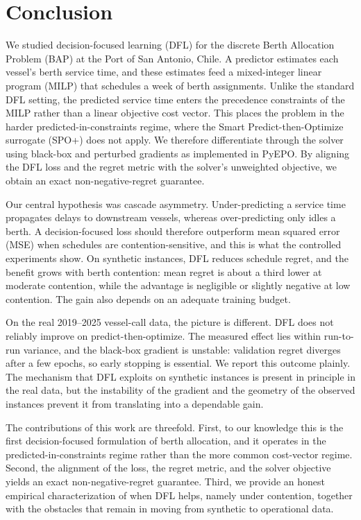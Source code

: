 \section{Conclusion}\label{sec:conclusion}

We studied decision-focused learning (DFL) for the discrete Berth Allocation Problem (BAP) at the Port of San Antonio, Chile. A predictor estimates each vessel's berth service time, and these estimates feed a mixed-integer linear program (MILP) that schedules a week of berth assignments. Unlike the standard DFL setting, the predicted service time enters the precedence constraints of the MILP rather than a linear objective cost vector. This places the problem in the harder predicted-in-constraints regime, where the Smart Predict-then-Optimize surrogate (SPO+) does not apply. We therefore differentiate through the solver using black-box and perturbed gradients as implemented in PyEPO. By aligning the DFL loss and the regret metric with the solver's unweighted objective, we obtain an exact non-negative-regret guarantee.

Our central hypothesis was cascade asymmetry. Under-predicting a service time propagates delays to downstream vessels, whereas over-predicting only idles a berth. A decision-focused loss should therefore outperform mean squared error (MSE) when schedules are contention-sensitive, and this is what the controlled experiments show. On synthetic instances, DFL reduces schedule regret, and the benefit grows with berth contention: mean regret is about a third lower at moderate contention, while the advantage is negligible or slightly negative at low contention. The gain also depends on an adequate training budget.

On the real 2019--2025 vessel-call data, the picture is different. DFL does not reliably improve on predict-then-optimize. The measured effect lies within run-to-run variance, and the black-box gradient is unstable: validation regret diverges after a few epochs, so early stopping is essential. We report this outcome plainly. The mechanism that DFL exploits on synthetic instances is present in principle in the real data, but the instability of the gradient and the geometry of the observed instances prevent it from translating into a dependable gain.

The contributions of this work are threefold. First, to our knowledge this is the first decision-focused formulation of berth allocation, and it operates in the predicted-in-constraints regime rather than the more common cost-vector regime. Second, the alignment of the loss, the regret metric, and the solver objective yields an exact non-negative-regret guarantee. Third, we provide an honest empirical characterization of when DFL helps, namely under contention, together with the obstacles that remain in moving from synthetic to operational data.

